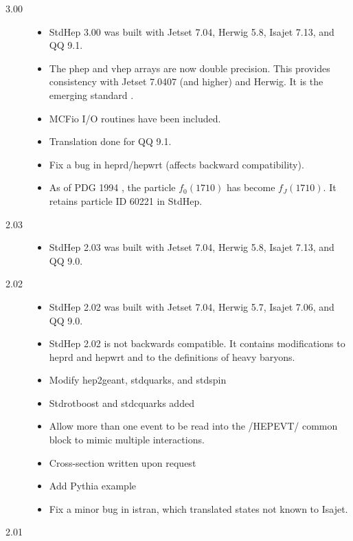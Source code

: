 \begin{description}
\item[3.00]

\begin{itemize}
\item StdHep 3.00 was built with Jetset 7.04, Herwig 5.8, Isajet 7.13, and QQ 9.1.
\item The phep and vhep arrays are now double precision.
This provides consistency with Jetset 7.0407 (and higher) and Herwig.
It is the emerging standard \cite{lund}.
\item MCFio I/O routines have been included.
\item Translation done for QQ 9.1.
\item Fix a bug in heprd/hepwrt (affects backward compatibility).
\item As of PDG 1994 \cite{pdg94}, the particle $f_0(1710)$
has become $f_J(1710)$.  It retains particle ID 60221 in StdHep.
\end{itemize}

\item[2.03]

\begin{itemize}
\item StdHep 2.03 was built with Jetset 7.04, Herwig 5.8, Isajet 7.13, and QQ 9.0.
\end{itemize}

\item[2.02]

\begin{itemize}
\item StdHep 2.02 was built with Jetset 7.04, Herwig 5.7, Isajet 7.06, and QQ 9.0.
\item StdHep 2.02 is not backwards compatible.  It contains modifications
to heprd and hepwrt and to the definitions of heavy baryons.
\item Modify hep2geant, stdquarks, and stdspin
\item Stdrotboost and stdcquarks added
\item Allow more than one event to be read into the /HEPEVT/ common block
to mimic multiple interactions.
\item Cross-section written upon request
\item Add Pythia example
\item Fix a minor bug in istran, which translated states not known to Isajet.
\end{itemize}

\item[2.01]


\end{description}
